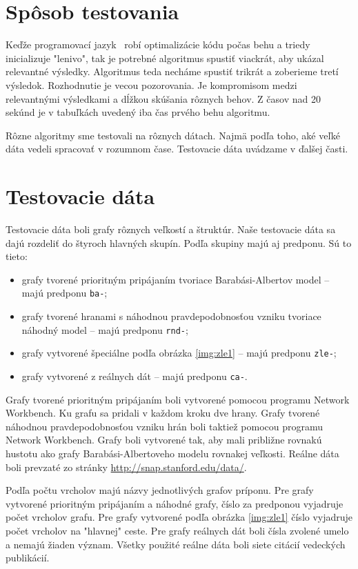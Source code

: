 \section{Spôsob testovania}

Keďže programovací jazyk \Java\ robí optimalizácie kódu počas behu a triedy 
inicializuje "lenivo", tak je potrebné algoritmus spustiť viackrát, aby ukázal 
relevantné výsledky. Algoritmus teda necháme spustiť trikrát a zoberieme tretí 
výsledok. Rozhodnutie je vecou pozorovania. Je kompromisom medzi relevantnými 
výsledkami a dĺžkou skúšania rôznych behov. Z časov nad 20 sekúnd je v 
tabuľkách uvedený iba čas prvého behu algoritmu. 

Rôzne algoritmy sme testovali na rôznych dátach. Najmä podľa toho, aké veľké 
dáta vedeli spracovať v rozumnom čase. Testovacie dáta uvádzame v ďalšej časti.

\section{Testovacie dáta}

Testovacie dáta boli grafy rôznych veľkostí a štruktúr. Naše testovacie dáta sa 
dajú rozdeliť do štyroch hlavných skupín. Podľa skupiny majú aj predponu. Sú to 
tieto:

\begin{itemize}
	\item grafy tvorené prioritným pripájaním tvoriace Barabási-Albertov model 
		-- majú predponu \texttt{ba-};
	\item grafy tvorené hranami s náhodnou pravdepodobnosťou vzniku tvoriace 
	náhodný model -- majú predponu \texttt{rnd-};
	\item grafy vytvorené špeciálne podľa obrázka \ref{img:zle1} -- majú 
		predponu \texttt{zle-};
	\item grafy vytvorené z reálnych dát -- majú predponu \texttt{ca-}.
\end{itemize}

Grafy tvorené prioritným pripájaním boli vytvorené pomocou programu Network 
Workbench. Ku grafu sa pridali v každom kroku dve hrany.
Grafy tvorené náhodnou pravdepodobnosťou vzniku hrán boli taktiež pomocou 
programu Network Workbench. Grafy boli vytvorené tak, aby mali približne 
rovnakú hustotu ako grafy Barabási-Albertoveho modelu rovnakej veľkosti.
Reálne dáta boli prevzaté zo stránky \url{http://snap.stanford.edu/data/}.

Podľa počtu vrcholov majú názvy jednotlivých grafov príponu. Pre grafy 
vytvorené prioritným pripájaním a náhodné grafy, číslo za predponou vyjadruje 
počet vrcholov grafu. Pre grafy vytvorené podľa obrázka \ref{img:zle1} číslo 
vyjadruje počet vrcholov na "hlavnej" ceste. Pre grafy reálnych dát boli čísla 
zvolené umelo a nemajú žiaden význam. Všetky použité reálne dáta boli siete 
citácií vedeckých publikácií.

